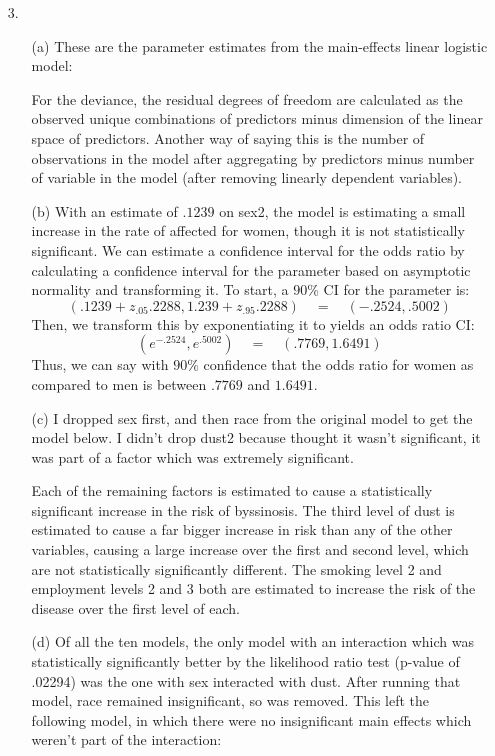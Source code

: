\documentclass[11pt]{article}
\theoremstyle{definition}
\begin{document}
\begin{itemize}
\begin{itemize}
        \end{itemize}
    \item[3.]
        \begin{itemize}
            \item[(a)]
                These are the parameter estimates from the main-effects linear logistic model:
                \FloatBarrier
                
                \FloatBarrier
                For the deviance, the residual degrees of freedom are calculated as the observed unique combinations of predictors minus dimension of the linear space of predictors. Another way of saying this is the number of observations in the model after aggregating by predictors minus number of variable in the model (after removing linearly dependent variables). 
            \item[(b)]
                With an estimate of $.1239$ on sex2, the model is estimating a small increase in the rate of affected for women, though it is not statistically significant. We can estimate a confidence interval for the odds ratio by calculating a confidence interval for the parameter based on asymptotic normality and transforming it. To start, a $90\%$ CI for the parameter is:
                \[(.1239+z_{.05}.2288,1.239+z_{.95}.2288)\quad=\quad(-.2524,.5002)\]
                Then, we transform this by exponentiating it to yields an odds ratio CI:
                \[(e^{-.2524},e^{.5002})\quad=\quad (.7769,1.6491)\]
                Thus, we can say with $90\%$ confidence that the odds ratio for women as compared to men is between $.7769$ and $1.6491$.
            \item[(c)]
                I dropped sex first, and then race from the original model to get the model below. I didn't drop dust2 because thought it wasn't significant, it was part of a factor which was extremely significant.
                \FloatBarrier
                
                \FloatBarrier
                Each of the remaining factors is estimated to cause a statistically significant increase in the risk of byssinosis. The third level of dust is estimated to cause a far bigger increase in risk than any of the other variables, causing a large increase over the first and second level, which are not statistically significantly different. The smoking level 2 and employment levels 2 and 3 both are estimated to increase the risk of the disease over the first level of each.
            \item[(d)]
                Of all the ten models, the only model with an interaction which was statistically significantly better by the likelihood ratio test (p-value of .02294) was the one with sex interacted with dust. After running that model, race remained insignificant, so was removed. This left the following model, in which there were no insignificant main effects which weren't part of the interaction:

\end{itemize}
\end{itemize}
\end{document}
